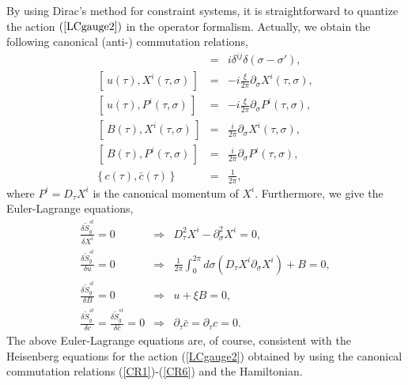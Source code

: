 \documentclass[12pt,a4paper]{article}
\newcommand{\ptau}{\partial_\tau}
\newcommand{\psig}{\partial_\sigma}
\newcommand{\To}{\Rightarrow}
\begin{document}
By using Dirac's method for constraint systems, it is straightforward
to quantize the action $(\ref{LCgauge2})$ in the operator formalism.
Actually, we obtain the following canonical (anti-)
commutation relations,
\begin{eqnarray}
  [\,X^i(\tau,\sigma),P^j(\tau,\sigma')\,]
  &=&i\delta^{ij}\delta(\sigma-\sigma'),\label{CR1}\\
  {}[\,u(\tau), X^i(\tau,\sigma)\,] &=& -i\frac{\xi}{2\pi}\psig
	 X^i(\tau,\sigma),\label{CR2}\\
  {}[\,u(\tau), P^i(\tau,\sigma)\,] &=& -i\frac{\xi}{2\pi}\psig
	 P^i(\tau,\sigma),\label{CR3}\\
  {}[\,B(\tau), X^i(\tau,\sigma)\,] &=& \frac{i}{2\pi}\psig
	X^i(\tau,\sigma),\label{CR4}\\
  {}[\,B(\tau), P^i(\tau,\sigma)\,] &=& \frac{i}{2\pi}\psig
	P^i(\tau,\sigma),\label{CR5}\\
  \{\,c(\tau),\bar{c}(\tau)\,\}&=&\frac{1}{2\pi},\label{CR6}
\end{eqnarray}
where $P^i=D_{\tau}X^i$ is the canonical momentum of $X^i$.
Furthermore, we give the Euler-Lagrange equations,
\begin{eqnarray}
  \frac{\delta \tilde{S}_g^{st}}{\delta X^i}=0
    &\To&D_{\tau}^2 X^i-\psig^2 X^i=0,\label{EL1}\\
  \frac{\delta \tilde{S}_g^{st}}{\delta u}=0
    &\To&\frac{1}{2\pi}\int_0^{2\pi}d\sigma
	 (D_{\tau}X^i\psig X^i)+B=0,\label{EL2}\\
  \frac{\delta \tilde{S}_g^{st}}{\delta B}=0
    &\To&u+\xi B=0,\label{EL3}\\
  \frac{\delta \tilde{S}_g^{st}}{\delta c}
    =\frac{\delta \tilde{S}_g^{st}}{\delta \bar{c}}=0
    &\To&\ptau \bar{c}= \ptau c=0.\label{EL4}
\end{eqnarray}
The above Euler-Lagrange equations are, of course,
consistent with the Heisenberg equations for the action
(\ref{LCgauge2}) obtained by using the canonical commutation relations
(\ref{CR1})-(\ref{CR6}) and the Hamiltonian.
\end{document}
